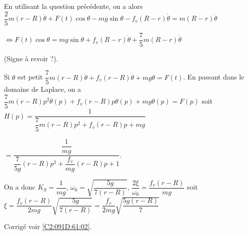 En utilisant la question précédente, on a alors 
$\dfrac{2}{5}m(r-R)\ddot{\theta}+F(t)\cos\theta-mg\sin\theta -f_v \left(R-r\right)\dot{\theta} =  m(R-r)\ddot{\theta}$

$\Longleftrightarrow F(t)\cos\theta = mg\sin\theta  + f_v \left(R-r\right)\dot{\theta} + \dfrac{7}{5}m(R-r)\ddot{\theta}$

(Signe à revoir ?).
\else
\fi


\ifprof
Si $\theta$ est petit $\dfrac{7}{5}m\left(r-R\right)\ddot{\theta} +f_v\left(r-R\right)\dot{\theta}+mg\theta=F(t)$. 
En passant dans le domaine de Laplace, on a $\dfrac{7}{5}m\left(r-R\right)p^2{\theta(p)} +f_v\left(r-R\right)p {\theta(p)}+mg\theta(p)=F(p)$
soit $H(p)=\dfrac{1}{\dfrac{7}{5}m\left(r-R\right)p^2 +f_v\left(r-R\right)p +mg}$

$ = \dfrac{\dfrac{1}{mg}}{\dfrac{7}{5g}\left(r-R\right)p^2 +\dfrac{f_v}{mg}\left(r-R\right)p +1}$.

On a donc $K_S = \dfrac{1}{mg}$, $\omega_0 = \sqrt{\dfrac{5g}{7\left(r-R\right)}}$,
$\dfrac{2 \xi }{\omega_0} = \dfrac{f_v\left(r-R\right)}{mg}$ soit $\xi =\dfrac{f_v\left(r-R\right)}{2mg}\sqrt{\dfrac{5g}{7\left(r-R\right)}} =\dfrac{f_v}{2mg}\sqrt{\dfrac{5g\left(r-R\right)}{7}} $

\else
\fi


\ifprof
\else
\begin{flushright}
\footnotesize{Corrigé  voir \ref{C2:091D:61:02}.}
\end{flushright}%
\fi